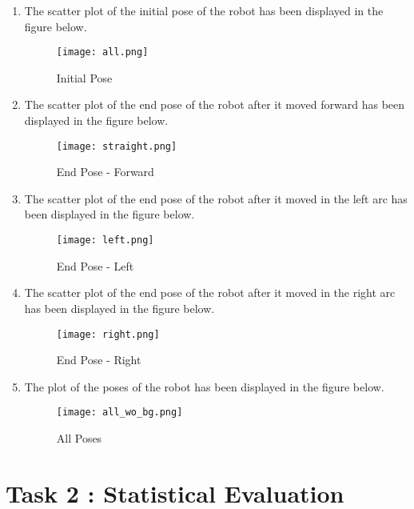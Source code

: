 \documentclass[10pt,a4paper]{article}
\begin{document}
\begin{enumerate}
	\item
	The scatter plot of the initial pose of the robot has been displayed in the figure below.

\begin{figure}[H]
	\centering
	\texttt{[image: all.png]}
	\caption{Initial Pose}
\end{figure}

\newpage
\item
The scatter plot of the end pose of the robot after it moved forward has been displayed in the figure below.

\begin{figure}[H]
	\centering
	\texttt{[image: straight.png]}
	\caption{End Pose - Forward}
\end{figure}



\newpage
\item
The scatter plot of the end pose of the robot after it moved in the left arc has been displayed in the figure below.

\begin{figure}[H]
	\centering
	\texttt{[image: left.png]}
	\caption{End Pose - Left}
\end{figure}


\newpage
\item
The scatter plot of the end pose of the robot after it moved in the right arc has been displayed in the figure below.

\begin{figure}[H]
	\centering
	\texttt{[image: right.png]}
	\caption{End Pose - Right}
\end{figure}



\newpage
\item
The plot of the poses of the robot has been displayed in the figure below.

\begin{figure}[H]
	\centering
	\texttt{[image: all\_wo\_bg.png]}
	\caption{All Poses}
\end{figure}

\end{enumerate}

\newpage
\section{Task 2 : Statistical Evaluation}
\end{document}
